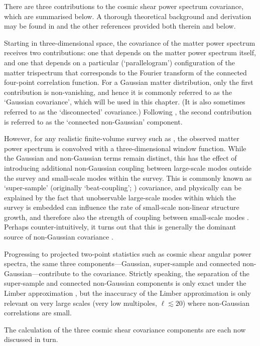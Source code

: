 There are three contributions to the cosmic shear power spectrum covariance, which are summarised below. A thorough theoretical background and derivation may be found in \citet{Barreira2018ssc} and the other references provided both therein and below.

Starting in three-dimensional space, the covariance of the matter power spectrum receives two contributions: one that depends on the matter power spectrum itself, and one that depends on a particular (`parallelogram') configuration of the matter trispectrum that corresponds to the Fourier transform of the connected four-point correlation function. For a Gaussian matter distribution, only the first contribution is non-vanishing, and hence it is commonly referred to as the `Gaussian covariance', which will be used in this chapter. (It is also sometimes referred to as the `disconnected' covariance.) Following \citet{Barreira2018ssc}, the second contribution is referred to as the `connected non-Gaussian' component.

However, for any realistic finite-volume survey such as \Euclid{}, the observed matter power spectrum is convolved with a three-dimensional window function. While the Gaussian and non-Gaussian terms remain distinct, this has the effect of introducing additional non-Gaussian coupling between large-scale modes outside the survey and small-scale modes within the survey. This is commonly known as `super-sample' (originally `beat-coupling'; \citealt{Hamilton2006}) covariance, and physically can be explained by the fact that unobservable large-scale modes within which the survey is embedded can influence the rate of small-scale non-linear structure growth, and therefore also the strength of coupling between small-scale modes \citep{Takada2013, Barreira2018ssc}. Perhaps counter-intuitively, it turns out that this is generally the dominant source of non-Gaussian covariance \citep{Hamilton2006, Barreira2018b}.

Progressing to projected two-point statistics such as cosmic shear angular power spectra, the same three components---Gaussian, super-sample and connected non-Gaussian---contribute to the covariance. Strictly speaking, the separation of the super-sample and connected non-Gaussian components is only exact under the Limber approximation \citep{Barreira2018ssc}, but the inaccuracy of the Limber approximation is only relevant on very large scales (very low multipoles, $\ell \lesssim 20$) where non-Gaussian correlations are small.

The calculation of the three cosmic shear covariance components are each now discussed in turn.

